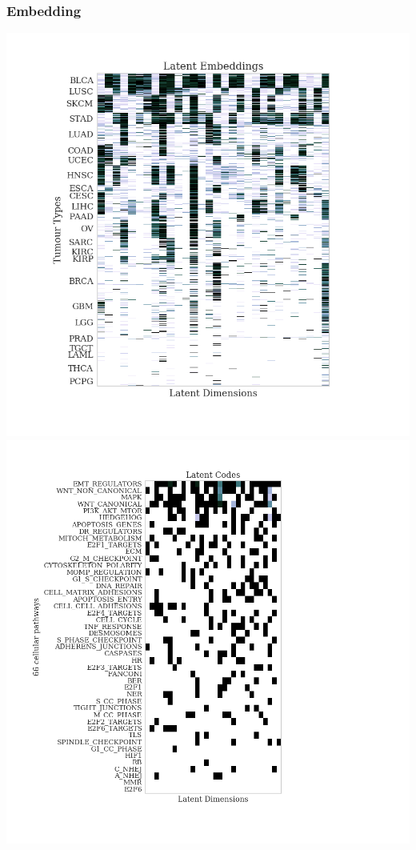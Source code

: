 \documentclass[11pt]{article}
\begin{document}
\subsubsection*{Embedding}
\label{sec-4-9-3}
\includegraphics[width=.9\linewidth]{./fa_pw_latent.png}
\includegraphics[width=.9\linewidth]{./fa_pw_patterns.png}
\end{document}
